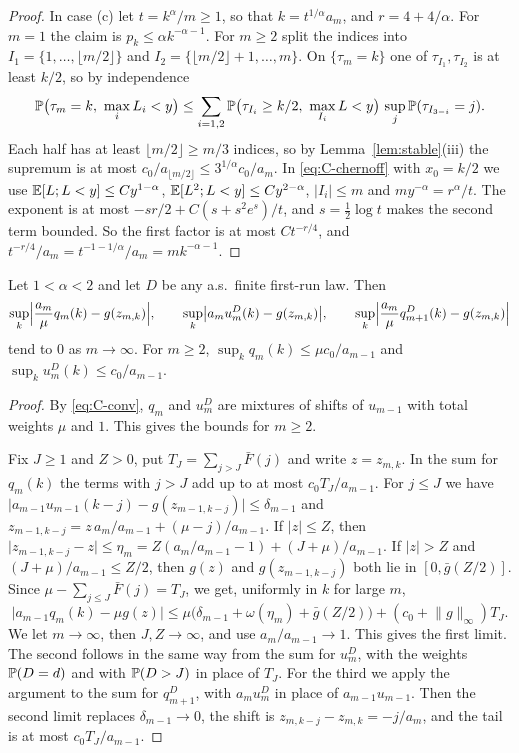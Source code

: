 \begin{proof}
In case (c) let $t=k^\alpha/m\ge1$, so that $k=t^{1/\alpha}a_m$, and
$r=4+4/\alpha$. For $m=1$ the claim is $p_k\le\alpha k^{-\alpha-1}$. For
$m\ge2$ split the indices into $I_1=\{1,\dots,\lfloor m/2\rfloor\}$ and
$I_2=\{\lfloor m/2\rfloor+1,\dots,m\}$. On $\{\tau_m=k\}$ one of
$\tau_{I_1},\tau_{I_2}$ is at least $k/2$, so by independence
\[
\Prob\bigl(\tau_m=k,\ \max_iL_i<y\bigr)\le\sum_{i=1,2}
\Prob\bigl(\tau_{I_i}\ge k/2,\ \max_{I_i}L<y\bigr)\,\sup_j\Prob(\tau_{I_{3-i}}=j).
\]
Each half has at least $\lfloor m/2\rfloor\ge m/3$ indices, so by
Lemma~\ref{lem:stable}(iii) the supremum is at most
$c_0/a_{\lfloor m/2\rfloor}\le3^{1/\alpha}c_0/a_m$. In \eqref{eq:C-chernoff}
with $x_0=k/2$ we use $\mathbb{E}[L;L<y]\le Cy^{1-\alpha}$,
$\mathbb{E}[L^2;L<y]\le Cy^{2-\alpha}$, $\lvert I_i\rvert\le m$ and
$my^{-\alpha}=r^\alpha/t$. The exponent is at most $-sr/2+C(s+s^2e^s)/t$,
and $s=\frac12\log t$ makes the second term bounded. So the first factor is at
most $Ct^{-r/4}$, and $t^{-r/4}/a_m=t^{-1-1/\alpha}/a_m=mk^{-\alpha-1}$.
\end{proof}

\begin{lemma}\label{lem:C-firstpassage}
Let $1<\alpha<2$ and let $D$ be any a.s.\ finite first-run law. Then
\[
\sup_k\Bigl\lvert\frac{a_m}\mu q_m(k)-g(z_{m,k})\Bigr\rvert,\qquad
\sup_k\bigl\lvert a_mu^D_m(k)-g(z_{m,k})\bigr\rvert,\qquad
\sup_k\Bigl\lvert\frac{a_m}\mu q^D_{m+1}(k)-g(z_{m,k})\Bigr\rvert
\]
tend to $0$ as $m\to\infty$. For $m\ge2$, $\sup_kq_m(k)\le\mu c_0/a_{m-1}$
and $\sup_ku^D_m(k)\le c_0/a_{m-1}$.
\end{lemma}

\begin{proof}
By \eqref{eq:C-conv}, $q_m$ and $u^D_m$ are mixtures of shifts of $u_{m-1}$
with total weights $\mu$ and $1$. This gives the bounds for $m\ge2$.

Fix $J\ge1$ and $Z>0$, put $T_J=\sum_{j>J}\bar F(j)$ and write $z=z_{m,k}$.
In the sum for $q_m(k)$ the terms with $j>J$ add up to at most
$c_0T_J/a_{m-1}$. For $j\le J$ we have
$\lvert a_{m-1}u_{m-1}(k-j)-g(z_{m-1,k-j})\rvert\le\delta_{m-1}$ and
$z_{m-1,k-j}=z\,a_m/a_{m-1}+(\mu-j)/a_{m-1}$. If $\lvert z\rvert\le Z$, then
$\lvert z_{m-1,k-j}-z\rvert\le\eta_m=Z(a_m/a_{m-1}-1)+(J+\mu)/a_{m-1}$. If
$\lvert z\rvert>Z$ and $(J+\mu)/a_{m-1}\le Z/2$, then $g(z)$ and
$g(z_{m-1,k-j})$ both lie in $[0,\bar g(Z/2)]$. Since
$\mu-\sum_{j\le J}\bar F(j)=T_J$, we get, uniformly in $k$ for large $m$,
\[
\bigl\lvert a_{m-1}q_m(k)-\mu g(z)\bigr\rvert
\le\mu\bigl(\delta_{m-1}+\omega(\eta_m)+\bar g(Z/2)\bigr)
+(c_0+\lVert g\rVert_\infty)T_J .
\]
We let $m\to\infty$, then $J,Z\to\infty$, and use $a_m/a_{m-1}\to1$. This
gives the first limit. The second follows in the same way from the sum for
$u^D_m$, with the weights $\mathbb{P}(D=d)$ and with $\mathbb{P}(D>J)$ in place of
$T_J$. For the third we apply the argument to the sum for $q^D_{m+1}$, with
$a_mu^D_m$ in place of $a_{m-1}u_{m-1}$. Then the second limit replaces
$\delta_{m-1}\to0$, the shift is $z_{m,k-j}-z_{m,k}=-j/a_m$, and the tail is
at most $c_0T_J/a_{m-1}$.
\end{proof}

